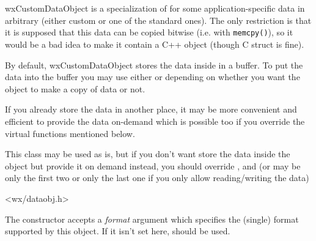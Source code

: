 \section{}\label{wxcustomdataobject}

wxCustomDataObject is a specialization of 
 for some
application-specific data in arbitrary (either custom or one of the standard
ones). The only restriction is that it is supposed that this data can be
copied bitwise (i.e. with {\tt memcpy()}), so it would be a bad idea to make
it contain a C++ object (though C struct is fine).

By default, wxCustomDataObject stores the data inside in a buffer. To put the
data into the buffer you may use either 
 or 
 depending on whether you want
the object to make a copy of data or not.

If you already store the data in another place, it may be more convenient and
efficient to provide the data on-demand which is possible too if you override
the virtual functions mentioned below.


This class may be used as is, but if you don't want store the data inside the
object but provide it on demand instead, you should override 
,
 and 
 (or may be only the first two or
only the last one if you only allow reading/writing the data)




<wx/dataobj.h>




\label{wxcustomdataobjectwxcustomdataobject}


The constructor accepts a {\it format} argument which specifies the (single)
format supported by this object. If it isn't set here, 
 should be used.

